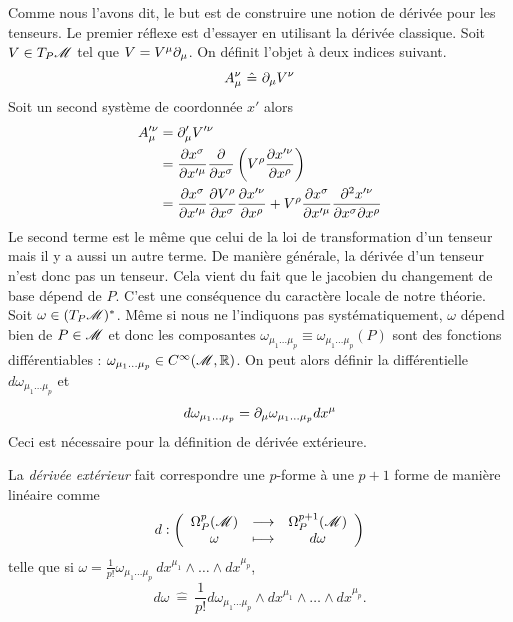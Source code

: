 \documentclass[a4paper,11pt]{report}
\begin{document}
            Comme nous l'avons dit, le but est de construire une notion de dérivée pour les tenseurs. Le premier réflexe est d'essayer en utilisant la dérivée classique. Soit $V\in T_P\mathscr{M}$ tel que $V = V^\mu \partial_\mu$. On définit l'objet à deux indices suivant.
            \begin{equation}
                A_\mu^\nu ~\hat{=}~ \partial_\mu V^\nu
            \end{equation}
            Soit un second système de coordonnée $x'$ alors 
            \begin{align}
                A'^\nu_\mu &= \partial'_\mu V'^\nu \\
                &= \pdv{x^\sigma}{x'^\mu}\pdv{}{x^\sigma}\left( V^\rho \pdv{x'^\nu}{x^\rho} \right)\\
                &= \pdv{x^\sigma}{x'^\mu}\pdv{V^\rho}{x^\sigma}\pdv{x'^\nu}{x^\rho}+V^\rho\pdv{x^\sigma}{x'^\mu}  \pdv{x'^\nu}{x^\sigma}{x^\rho}
            \end{align}
            Le second terme est le même que celui de la loi de transformation d'un tenseur mais il y a aussi un autre terme. De manière générale, la dérivée d'un tenseur n'est donc pas un tenseur. Cela vient du fait que le jacobien du changement de base dépend de $P$. C'est une conséquence du caractère locale de notre théorie.\\
            
            Soit $\omega\in (T_P\mathscr{M})^*$. Même si nous ne l'indiquons pas systématiquement, $\omega$ dépend bien de $P\in\mathscr{M}$ et donc les composantes $\omega_{\mu_1\dots\mu_p}\equiv \omega_{\mu_1\dots\mu_p}(P)$ sont des fonctions différentiables : $\omega_{\mu_1\dots\mu_p}\in C^{\infty}(\mathscr{M},\mathbb{R})$. On peut alors définir la différentielle $d\omega_{\mu_1\dots\mu_p}$ et
            \begin{equation}\label{eq:propdiffomega}
                d\omega_{\mu_1\dots\mu_p} = \partial_\mu \omega_{\mu_1\dots\mu_p}dx^\mu
            \end{equation}
            Ceci est nécessaire pour la définition de dérivée extérieure.
            
            \begin{definition}
                La \textit{dérivée extérieur} fait correspondre une $p$-forme à une $p+1$ forme de manière linéaire comme
                \begin{equation}
                d:\left(
                \begin{array}{ccc}
                    \Omega_P^p(\mathscr{M}) & \longrightarrow & \Omega_P^{p+1}(\mathscr{M}) \\
                    \omega & \longmapsto & d\omega
                \end{array}
                \right)
                \end{equation}
                telle que si $\omega = \frac{1}{p!}\omega_{\mu_1\dots\mu_p}~dx^{\mu_1}\wedge \dots\wedge dx^{\mu_p}$,
                \begin{equation}
                    d\omega ~\hat{=}~ \frac{1}{p!} d\omega_{\mu_1\dots\mu_p}\wedge dx^{\mu_1}\wedge \dots\wedge dx^{\mu_p}.
                \end{equation}
            \end{definition}
            
\end{document}
